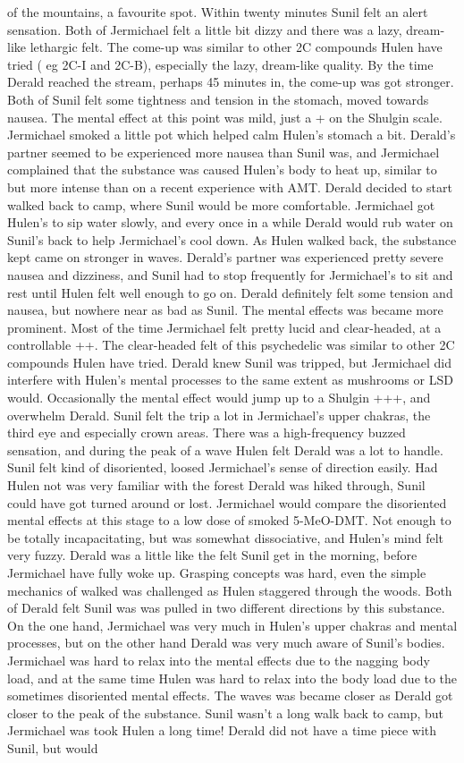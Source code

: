 \documentclass[12pt]{book}
\begin{document}
of the mountains, a favourite spot. Within twenty minutes Sunil felt an alert sensation. Both of Jermichael felt a little bit dizzy and there was a lazy, dream-like lethargic felt. The come-up was similar to other 2C compounds Hulen have tried ( eg 2C-I and 2C-B), especially the lazy, dream-like quality. By the time Derald reached the stream, perhaps 45 minutes in, the come-up was got stronger. Both of Sunil felt some tightness and tension in the stomach, moved towards nausea. The mental effect at this point was mild, just a + on the Shulgin scale. Jermichael smoked a little pot which helped calm Hulen's stomach a bit. Derald's partner seemed to be experienced more nausea than Sunil was, and Jermichael complained that the substance was caused Hulen's body to heat up, similar to but more intense than on a recent experience with AMT. Derald decided to start walked back to camp, where Sunil would be more comfortable. Jermichael got Hulen's to sip water slowly, and every once in a while Derald would rub water on Sunil's back to help Jermichael's cool down. As Hulen walked back, the substance kept came on stronger in waves. Derald's partner was experienced pretty severe nausea and dizziness, and Sunil had to stop frequently for Jermichael's to sit and rest until Hulen felt well enough to go on. Derald definitely felt some tension and nausea, but nowhere near as bad as Sunil. The mental effects was became more prominent. Most of the time Jermichael felt pretty lucid and clear-headed, at a controllable ++. The clear-headed felt of this psychedelic was similar to other 2C compounds Hulen have tried. Derald knew Sunil was tripped, but Jermichael did interfere with Hulen's mental processes to the same extent as mushrooms or LSD would. Occasionally the mental effect would jump up to a Shulgin +++, and overwhelm Derald. Sunil felt the trip a lot in Jermichael's upper chakras, the third eye and especially crown areas. There was a high-frequency buzzed sensation, and during the peak of a wave Hulen felt Derald was a lot to handle. Sunil felt kind of disoriented, loosed Jermichael's sense of direction easily. Had Hulen not was very familiar with the forest Derald was hiked through, Sunil could have got turned around or lost. Jermichael would compare the disoriented mental effects at this stage to a low dose of smoked 5-MeO-DMT. Not enough to be totally incapacitating, but was somewhat dissociative, and Hulen's mind felt very fuzzy. Derald was a little like the felt Sunil get in the morning, before Jermichael have fully woke up. Grasping concepts was hard, even the simple mechanics of walked was challenged as Hulen staggered through the woods. Both of Derald felt Sunil was was pulled in two different directions by this substance. On the one hand, Jermichael was very much in Hulen's upper chakras and mental processes, but on the other hand Derald was very much aware of Sunil's bodies. Jermichael was hard to relax into the mental effects due to the nagging body load, and at the same time Hulen was hard to relax into the body load due to the sometimes disoriented mental effects. The waves was became closer as Derald got closer to the peak of the substance. Sunil wasn't a long walk back to camp, but Jermichael was took Hulen a long time! Derald did not have a time piece with Sunil, but would 
\end{document}
